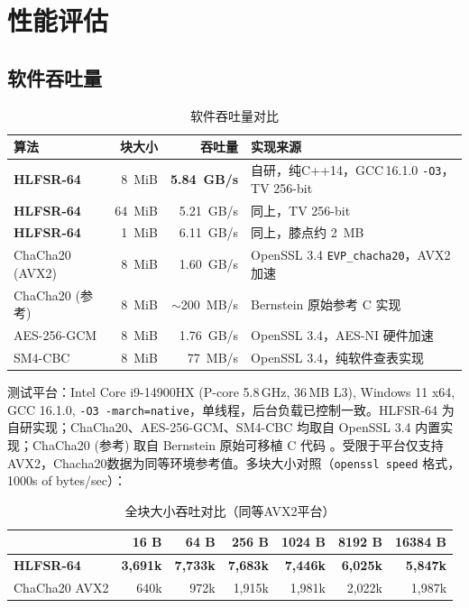 \documentclass[11pt,a4paper]{ctexart}
\begin{document}
\clearpage
\section{性能评估}

\subsection{软件吞吐量}

\begin{table}[H]
\centering
\begin{tabular}{@{}lrrl@{}}
\toprule
\textbf{算法} & \textbf{块大小} & \textbf{吞吐量} & \textbf{实现来源} \\
\midrule
\textbf{HLFSR-64} & 8~MiB  & \textbf{5.84~GB/s} & 自研，纯C++14，GCC\,16.1.0 \texttt{-O3}，TV 256-bit \\
\textbf{HLFSR-64} & 64~MiB & 5.21~GB/s & 同上，TV 256-bit \\
\textbf{HLFSR-64} & 1~MiB  & 6.11~GB/s & 同上，膝点约 2~MB \\
ChaCha20 (AVX2)   & 8~MiB  & 1.60~GB/s  & OpenSSL 3.4 \texttt{EVP\_chacha20}，AVX2 加速 \\
ChaCha20 (参考)    & 8~MiB  & $\sim$200~MB/s & Bernstein 原始参考 C 实现 \cite{chacha} \\
AES-256-GCM       & 8~MiB  & 1.76~GB/s  & OpenSSL 3.4，AES-NI 硬件加速 \\
SM4-CBC           & 8~MiB  & 77~MB/s    & OpenSSL 3.4，纯软件查表实现 \\
\bottomrule
\end{tabular}
\caption{软件吞吐量对比}
\label{tab:swperf}
\end{table}

测试平台：Intel Core i9-14900HX (P-core 5.8\,GHz, 36\,MB L3), Windows 11 x64, GCC 16.1.0, \texttt{-O3 -march=native}，单线程，后台负载已控制一致。HLFSR-64 为自研实现；ChaCha20、AES-256-GCM、SM4-CBC 均取自 OpenSSL 3.4 内置实现；ChaCha20 (参考) 取自 Bernstein 原始可移植 C 代码 \cite{chacha}。受限于平台仅支持AVX2，Chacha20数据为同等环境参考值。多块大小对照（\texttt{openssl speed} 格式，1000s of bytes/sec）：

\begin{table}[H]
\centering
\footnotesize
\begin{tabular}{@{}lrrrrrr@{}}
\toprule
& 16 B & 64 B & 256 B & 1024 B & 8192 B & 16384 B \\
\midrule
\textbf{HLFSR-64} & \textbf{3,691k} & \textbf{7,733k} & \textbf{7,683k} & \textbf{7,446k} & \textbf{6,025k} & \textbf{5,847k} \\
ChaCha20 AVX2      & 640k & 972k & 1,915k & 1,981k & 2,022k & 1,987k \\
\bottomrule
\end{tabular}
\caption{全块大小吞吐对比（同等AVX2平台）}
\label{tab:speed_all}
\end{table}
\end{document}
